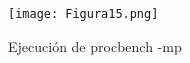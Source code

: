\begin{figure}[H] 
\centering
\texttt{[image: Figura15.png]}  
\caption{Ejecución de procbench -mp}\label{fig:figura15}
\end{figure}


\newpage



